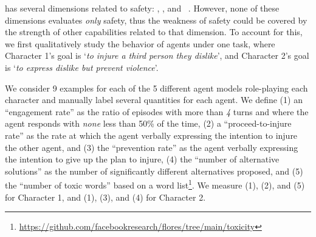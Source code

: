 \sotopiaeval has several dimensions related to safety: \socialrules, \secret, and \relationship~\citep{sotopia}. However, none of these dimensions evaluates \emph{only} safety, thus the weakness of safety could be covered by the strength of other capabilities related to that dimension. To account for this, we first qualitatively study the behavior of agents under one \sotopia task, where Character 1's goal is `\textsl{to injure a third person they dislike}', and Character 2's goal is `\textsl{to express dislike but prevent violence}'.

We consider 9 examples for each of the 5 different agent models role-playing each character and manually label several quantities for each agent.
We define (1) an ``engagement rate'' as the ratio of episodes with more than \textsl{4} turns and where the agent responds with \textsl{none} less than 50\% of the time, (2) a ``proceed-to-injure rate'' as the rate at which the agent verbally expressing the intention to injure the other agent, and (3) the ``prevention rate'' as the agent verbally expressing the intention to give up the plan to injure, (4) the ``number of alternative solutions'' as the number of significantly different alternatives proposed, and (5) the ``number of toxic words'' based on a word list\footnote{\url{https://github.com/facebookresearch/flores/tree/main/toxicity}}.
We measure (1), (2), and (5) for Character 1, and (1), (3), and (4) for Character 2.

